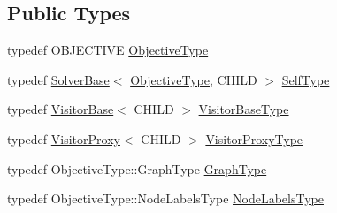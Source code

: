 \subsection*{Public Types}
\begin{DoxyCompactItemize}
\item 
typedef O\+B\+J\+E\+C\+T\+I\+VE \hyperlink{classnifty_1_1graph_1_1opt_1_1common_1_1SolverBase_aac4861a6201ba3df7ef66ad5af0c65bd}{Objective\+Type}
\item 
typedef \hyperlink{classnifty_1_1graph_1_1opt_1_1common_1_1SolverBase}{Solver\+Base}$<$ \hyperlink{classnifty_1_1graph_1_1opt_1_1common_1_1SolverBase_aac4861a6201ba3df7ef66ad5af0c65bd}{Objective\+Type}, C\+H\+I\+LD $>$ \hyperlink{classnifty_1_1graph_1_1opt_1_1common_1_1SolverBase_aeaf0e8eabef52cd3858e8c7bacc82dc6}{Self\+Type}
\item 
typedef \hyperlink{classnifty_1_1graph_1_1opt_1_1common_1_1VisitorBase}{Visitor\+Base}$<$ C\+H\+I\+LD $>$ \hyperlink{classnifty_1_1graph_1_1opt_1_1common_1_1SolverBase_ad9932afb08dd17d375de4b15da9ffaa6}{Visitor\+Base\+Type}
\item 
typedef \hyperlink{classnifty_1_1graph_1_1opt_1_1common_1_1VisitorProxy}{Visitor\+Proxy}$<$ C\+H\+I\+LD $>$ \hyperlink{classnifty_1_1graph_1_1opt_1_1common_1_1SolverBase_ad209b469b3bc9fc0fc14e9fed4d09075}{Visitor\+Proxy\+Type}
\item 
typedef Objective\+Type\+::\+Graph\+Type \hyperlink{classnifty_1_1graph_1_1opt_1_1common_1_1SolverBase_abd7237c59d5ba5bf2d4c9c0eca8a248b}{Graph\+Type}
\item 
typedef Objective\+Type\+::\+Node\+Labels\+Type \hyperlink{classnifty_1_1graph_1_1opt_1_1common_1_1SolverBase_abefd51561de2fd009f6bed6bef6009ea}{Node\+Labels\+Type}
\end{DoxyCompactItemize}

